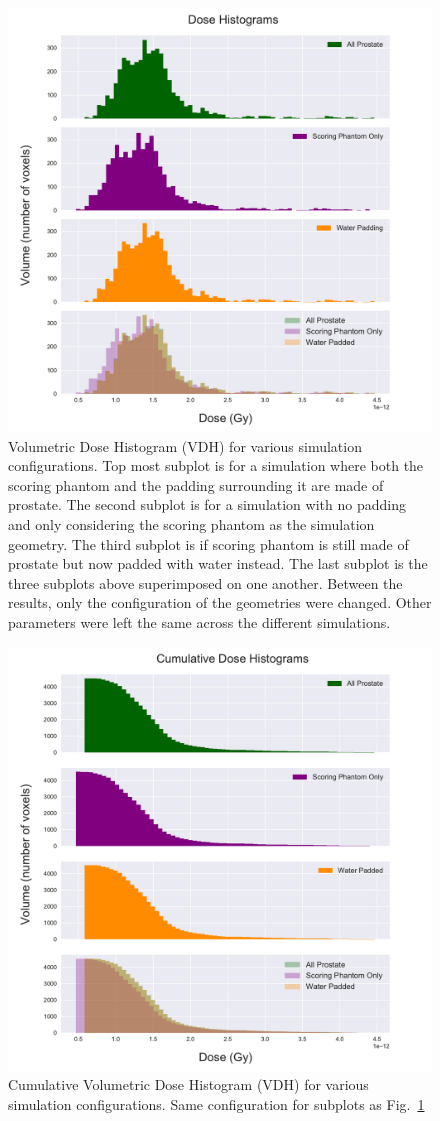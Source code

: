 \documentclass[12pt]{article}
\begin{document}
\begin{figure}[!ht]
	\centering
	\includegraphics[scale=0.43]{dose_histogram}  
	\caption{Volumetric Dose Histogram (VDH) for various simulation configurations. Top most subplot is for a simulation where both the scoring phantom and the padding surrounding it are made of prostate. The second subplot is for a simulation with no padding and only considering the scoring phantom as the simulation geometry. The third subplot is if scoring phantom is still made of prostate but now padded with water instead. The last subplot is the three subplots above superimposed on one another. Between the results, only the configuration of the geometries were changed. Other parameters were left the same across the different simulations.}
	\label{fig:dose_histogram}
\end{figure}

\begin{figure}[!ht]
	\centering
	\includegraphics[scale=0.5]{cum_dose_histogram}  
	\caption{Cumulative Volumetric Dose Histogram (VDH) for various simulation configurations. Same configuration for subplots as Fig.~\ref{fig:dose_histogram}}
	\label{fig:cumulative_dose_histogram}
\end{figure}
\end{document}
